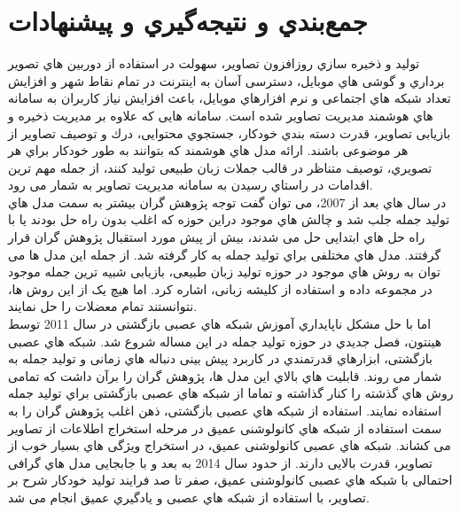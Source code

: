 \chapter{جمع‌بندي و نتيجه‌گيري و پیشنهادات}
تولید و ذخیره سازي روزافزون تصاویر، سهولت در استفاده از دوربین هاي تصویر برداري و گوشی هاي موبایل،
دسترسی آسان به اینترنت در تمام نقاط شهر و افزایش تعداد شبکه هاي اجتماعی و نرم افزارهاي موبایل، باعث
افزایش نیاز کاربران به سامانه هاي هوشمند مدیریت تصاویر شده است. سامانه هایی که علاوه بر مدیریت ذخیره و
بازیابی تصاویر، قدرت دسته بندي خودکار، جستجوي محتوایی، درك و توصیف تصاویر از هر موضوعی باشند.
ارائه مدل هاي هوشمند که بتوانند به طور خودکار براي هر تصویري، توصیف متناظر در قالب جملات زبان طبیعی
تولید کنند، از جمله مهم ترین اقدامات در راستاي رسیدن به سامانه مدیریت تصاویر به شمار می رود.\\
در سال هاي بعد از  2007، می توان گفت توجه پژوهش گران بیشتر به سمت مدل هاي تولید جمله جلب شد و
چالش هاي موجود دراین حوزه که اغلب بدون راه حل بودند یا با راه حل هاي ابتدایی حل می شدند، بیش از پیش
مورد استقبال پژوهش گران قرار گرفتند. مدل هاي مختلفی براي تولید جمله به کار گرفته شد. از جمله این مدل ها
می توان به روش هاي موجود در حوزه تولید زبان طبیعی، بازیابی شبیه ترین جمله موجود در مجموعه داده و استفاده
از کلیشه زبانی، اشاره کرد. اما هیچ یک از این روش ها، نتوانستند تمام معضلات را حل نمایند.\\
اما با حل مشکل ناپایداري آموزش شبکه هاي عصبی بازگشتی در سال  2011 توسط هینتون، فصل جدیدي در
حوزه تولید جمله در این مساله شروع شد. شبکه هاي عصبی بازگشتی، ابزارهاي قدرتمندي در کاربرد پیش بینی
دنباله هاي زمانی و تولید جمله به شمار می روند. قابلیت هاي بالاي این مدل ها، پژوهش گران را برآن داشت که
تمامی روش هاي گذشته را کنار گذاشته و تماما از شبکه هاي عصبی بازگشتی براي تولید جمله استفاده نمایند.
استفاده از شبکه هاي عصبی بازگشتی، ذهن اغلب پژوهش گران را به سمت استفاده از شبکه هاي کانولوشنی عمیق
در مرحله استخراج اطلاعات از تصاویر می کشاند. شبکه هاي عصبی کانولوشنی عمیق، در استخراج ویژگی هاي
بسیار خوب از تصاویر، قدرت بالایی دارند. از حدود سال  2014 به بعد و با جابجایی مدل هاي گرافی احتمالی
با شبکه هاي عصبی کانولوشنی عمیق، صفر تا صد فرایند تولید خودکار شرح بر تصاویر، با استفاده از شبکه هاي
عصبی و یادگیري عمیق انجام می شد.
